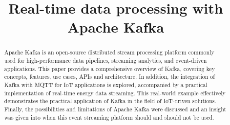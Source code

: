 \documentclass[conference]{IEEEtran}
\begin{document}
\title{Real-time data processing with Apache Kafka}

\author{
}

\maketitle

\begin{abstract}
Apache Kafka is an open-source distributed stream processing platform commonly used for high-performance data pipelines, streaming analytics, and event-driven applications. This paper provides a comprehensive overview of Kafka, covering key concepts, features, use cases, APIs and architecture. In addition, the integration of Kafka with MQTT for IoT applications is explored, accompanied by a practical implementation of real-time energy data streaming. This real-world example effectively demonstrates the practical application of Kafka in the field of IoT-driven solutions. Finally, the possibilities and limitations of Apache Kafka were discussed and an insight was given into when this event streaming platform should and should not be used.

\end{abstract}












\graphicspath{{images/}}


\end{document}
